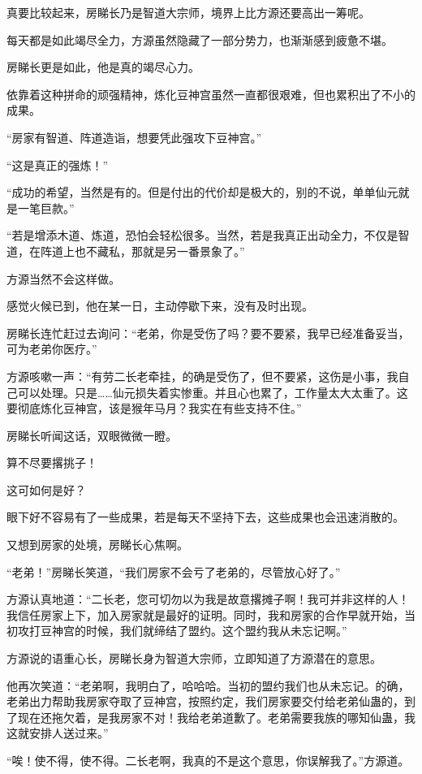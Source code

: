 \begin{this_body}
真要比较起来，房睇长乃是智道大宗师，境界上比方源还要高出一筹呢。

每天都是如此竭尽全力，方源虽然隐藏了一部分势力，也渐渐感到疲惫不堪。

房睇长更是如此，他是真的竭尽心力。

依靠着这种拼命的顽强精神，炼化豆神宫虽然一直都很艰难，但也累积出了不小的成果。

“房家有智道、阵道造诣，想要凭此强攻下豆神宫。”

“这是真正的强炼！”

“成功的希望，当然是有的。但是付出的代价却是极大的，别的不说，单单仙元就是一笔巨款。”

“若是增添木道、炼道，恐怕会轻松很多。当然，若是我真正出动全力，不仅是智道，在阵道上也不藏私，那就是另一番景象了。”

方源当然不会这样做。

感觉火候已到，他在某一日，主动停歇下来，没有及时出现。

房睇长连忙赶过去询问：“老弟，你是受伤了吗？要不要紧，我早已经准备妥当，可为老弟你医疗。”

方源咳嗽一声：“有劳二长老牵挂，的确是受伤了，但不要紧，这伤是小事，我自己可以处理。只是……仙元损失着实惨重。并且心也累了，工作量太大太重了。这要彻底炼化豆神宫，该是猴年马月？我实在有些支持不住。”

房睇长听闻这话，双眼微微一瞪。

算不尽要撂挑子！

这可如何是好？

眼下好不容易有了一些成果，若是每天不坚持下去，这些成果也会迅速消散的。

又想到房家的处境，房睇长心焦啊。

“老弟！”房睇长笑道，“我们房家不会亏了老弟的，尽管放心好了。”

方源认真地道：“二长老，您可切勿以为我是故意撂摊子啊！我可并非这样的人！我信任房家上下，加入房家就是最好的证明。同时，我和房家的合作早就开始，当初攻打豆神宫的时候，我们就缔结了盟约。这个盟约我从未忘记啊。”

方源说的语重心长，房睇长身为智道大宗师，立即知道了方源潜在的意思。

他再次笑道：“老弟啊，我明白了，哈哈哈。当初的盟约我们也从未忘记。的确，老弟出力帮助我房家夺取了豆神宫，按照约定，我们房家要交付给老弟仙蛊的，到了现在还拖欠着，是我房家不对！我给老弟道歉了。老弟需要我族的哪知仙蛊，我这就安排人送过来。”

“唉！使不得，使不得。二长老啊，我真的不是这个意思，你误解我了。”方源道。


\end{this_body}
